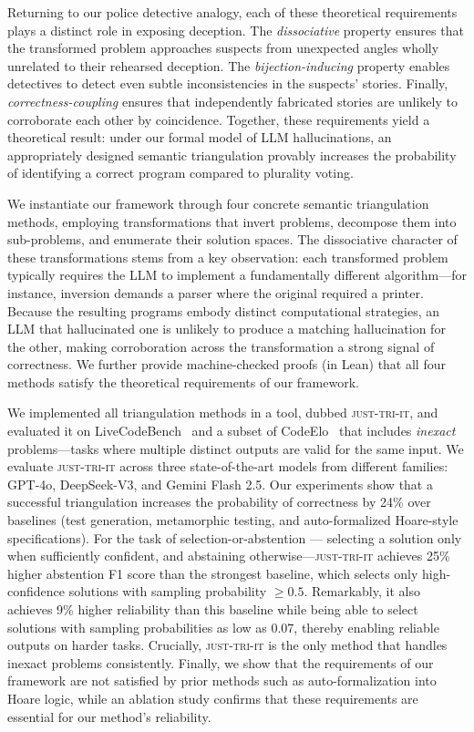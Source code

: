 \documentclass[acmsmall,screen,nonacm]{acmart}
\newcommand{\toolName}{\textsc{just-tri-it}\xspace}
\begin{document}
Returning to our police detective analogy, each of these theoretical requirements plays a distinct role in exposing deception. The \emph{dissociative} property ensures that the transformed problem approaches suspects from unexpected angles wholly unrelated to their rehearsed deception. The \emph{bijection-inducing} property enables detectives to detect even subtle inconsistencies in the suspects' stories. Finally, \emph{correctness-coupling} ensures that independently fabricated stories are unlikely to corroborate each other by coincidence. Together, these requirements yield a theoretical result: under our formal model of LLM hallucinations, an appropriately designed semantic triangulation provably increases the probability of identifying a correct program compared to plurality voting.

We instantiate our framework through four concrete semantic triangulation methods, employing transformations that invert problems, decompose them into sub-problems, and enumerate their solution spaces. The dissociative character of these transformations stems from a key observation: each transformed problem typically requires the LLM to implement a fundamentally different algorithm---for instance, inversion demands a parser where the original required a printer. Because the resulting programs embody distinct computational strategies, an LLM that hallucinated one is unlikely to produce a matching hallucination for the other, making corroboration across the transformation a strong signal of correctness. We further provide machine-checked proofs (in Lean) that all four methods satisfy the theoretical requirements of our framework.

We implemented all triangulation methods in a tool, dubbed \toolName, and evaluated it on LiveCodeBench~\cite{jain2024livecodebench} and a subset of CodeElo~\cite{quan2025codeelobenchmarkingcompetitionlevelcode} that includes \emph{inexact} problems---tasks where multiple distinct outputs are valid for the same input. We evaluate \toolName across three state-of-the-art models from different families: GPT-4o, DeepSeek-V3, and Gemini Flash 2.5. Our experiments show that a successful triangulation increases the probability of correctness by 24\% over baselines (test generation, metamorphic testing, and auto-formalized Hoare-style specifications). For the task of selection-or-abstention --- selecting a solution only when sufficiently confident, and abstaining otherwise---\toolName achieves 25\% higher abstention F1 score than the strongest baseline, which selects only high-confidence solutions with sampling probability $\geq 0.5$. Remarkably, it also achieves 9\% higher reliability than this baseline while being able to select solutions with sampling probabilities as low as 0.07, thereby enabling reliable outputs on harder tasks. Crucially, \toolName is the only method that handles inexact problems consistently. Finally, we show that the requirements of our framework are not satisfied by prior methods such as auto-formalization into Hoare logic, while an ablation study confirms that these requirements are essential for our method's reliability.
\end{document}

